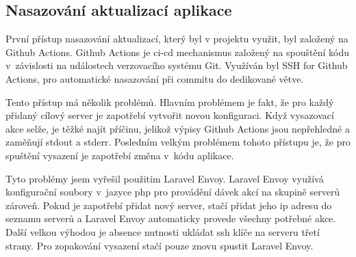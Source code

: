 \subsection{Nasazování aktualizací aplikace}
\label{sub:update-deployment}

První přístup nasazování aktualizací, který byl v projektu \bso{} využit, byl založený na Github Actions\cite{github-actions}.
Github Actions je \gls{ci-cd} mechanismus založený na spouštění kódu v~závislosti na událostech verzovacího systému Git\cite{git}. Využíván byl SSH for Github Actions\cite{ssh-for-github-actions}, pro automatické nasazování při commitu do dedikované větve.

Tento přístup má několik problémů. Hlavním problémem je fakt, že pro každý přidaný cílový server je zapotřebí vytvořit novou konfiguraci. Když vysazovací akce selže, je těžké najít příčinu, jelikož výpisy Github Actions jsou nepřehledné a zaměňují \acrshort{stdout} a \acrshort{stderr}. Posledním velkým problémem tohoto přístupu je, že pro spuštění vysazení je zapotřebí změna v~kódu aplikace.

Tyto problémy jsem vyřešil použitím Laravel Envoy\cite{laravel-envoy}. Laravel Envoy využívá konfigurační soubory v~jazyce \acrshort{php} pro provádění dávek akcí na skupině serverů zároveň. Pokud je zapotřebí přidat nový server, stačí přidat jeho \acrshort{ip} adresu do seznamu serverů a Laravel Envoy automaticky provede všechny potřebné akce. Další velkou výhodou je absence nutnosti ukládat \acrshort{ssh} klíče na serveru třetí strany. Pro zopakování vysazení stačí pouze znovu spustit Laravel Envoy.
